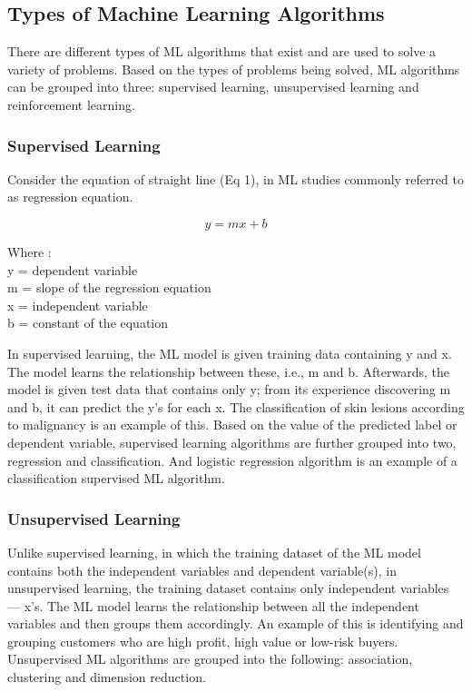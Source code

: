 \documentclass[conference]{IEEEtran}
\begin{document}
\subsection{Types of Machine Learning Algorithms}
There are different types of ML algorithms that exist and are used to solve a variety of problems. Based on the types of problems being solved, ML algorithms can be grouped into three: supervised learning, unsupervised learning and reinforcement learning.

\subsubsection{Supervised Learning}
Consider the equation of straight line (Eq 1), in ML studies commonly referred to as regression equation.
               
\begin{equation} 
\label{equ1}
y = mx+b 
\end{equation} 

Where :\\
y = dependent variable \\
m = slope of the regression equation\\
x = independent variable\\
b = constant of the equation

In supervised learning, the ML model is given training data containing y and x. The model learns the relationship between these, i.e., m and b. Afterwards, the model is given test data that contains only y; from its experience discovering m and b, it can predict the y's for each x. The classification of skin lesions according to malignancy is an example of this\cite{bb3}. Based on the value of the predicted label or dependent variable, supervised learning algorithms are further grouped into two, regression and classification. And logistic regression algorithm is an example of a classification supervised ML algorithm.\\

\subsubsection{Unsupervised Learning}
Unlike supervised learning, in which the training dataset of the ML model contains both the independent variables and dependent variable(s), in unsupervised learning, the training dataset contains only independent variables — x's. The ML model learns the relationship between all the independent variables and then groups them accordingly. An example of this is identifying and grouping customers who are high profit, high value or low-risk buyers\cite{bb4}. Unsupervised ML algorithms are grouped into the following: association, clustering and dimension reduction.
\end{document}
